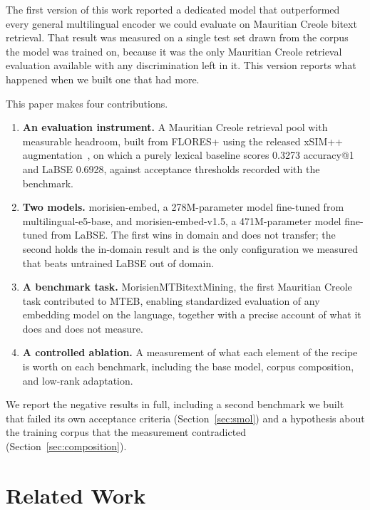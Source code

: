 \documentclass[11pt]{article}
\begin{document}
The first version of this work reported a dedicated model that outperformed every general
multilingual encoder we could evaluate on Mauritian Creole bitext retrieval. That result was measured
on a single test set drawn from the corpus the model was trained on, because it was the only
Mauritian Creole retrieval evaluation available with any discrimination left in it. This version
reports what happened when we built one that had more.

This paper makes four contributions.
\begin{enumerate}
\itemsep0.1em
\item \textbf{An evaluation instrument.} A Mauritian Creole retrieval pool with measurable headroom,
built from FLORES+ using the released xSIM++ augmentation~\citep{chen2023xsimpp}, on which a purely
lexical baseline scores 0.3273 accuracy@1 and LaBSE 0.6928, against acceptance thresholds recorded
with the benchmark.
\item \textbf{Two models.} morisien-embed, a 278M-parameter model fine-tuned from
multilingual-e5-base, and morisien-embed-v1.5, a 471M-parameter model fine-tuned from LaBSE. The
first wins in domain and does not transfer; the second holds the in-domain result and is the only
configuration we measured that beats untrained LaBSE out of domain.
\item \textbf{A benchmark task.} MorisienMTBitextMining, the first Mauritian Creole task contributed
to MTEB, enabling standardized evaluation of any embedding model on the language, together with a
precise account of what it does and does not measure.
\item \textbf{A controlled ablation.} A measurement of what each element of the recipe is worth on
each benchmark, including the base model, corpus composition, and low-rank adaptation.
\end{enumerate}

We report the negative results in full, including a second benchmark we built that failed its own
acceptance criteria (Section~\ref{sec:smol}) and a hypothesis about the training corpus that the
measurement contradicted (Section~\ref{sec:composition}).

\section{Related Work}
\end{document}
